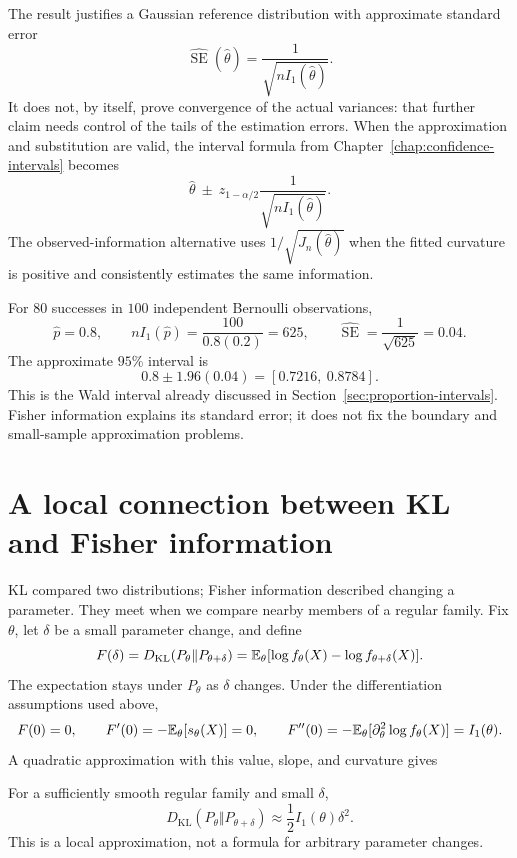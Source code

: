 The result justifies a Gaussian reference distribution with approximate
standard error
\[
  \widehat{\operatorname{SE}}(\widehat\theta)
  =\frac1{\sqrt{nI_1(\widehat\theta)}}.
\]
It does not, by itself, prove convergence of the actual variances:
that further claim needs control of the tails of the estimation errors.
When the approximation and substitution are valid, the interval formula
from Chapter~\ref{chap:confidence-intervals} becomes
\begin{equation}
  \widehat\theta\ \pm\
  z_{1-\alpha/2}\frac1{\sqrt{nI_1(\widehat\theta)}}.
  \label{eq:fisher-interval}
\end{equation}
The observed-information alternative uses
\(1/\sqrt{J_n(\widehat\theta)}\) when the fitted curvature is positive
and consistently estimates the same information.

For \(80\) successes in \(100\) independent Bernoulli observations,
\[
  \widehat p=0.8,\qquad
  nI_1(\widehat p)=\frac{100}{0.8(0.2)}=625,\qquad
  \widehat{\operatorname{SE}}=\frac1{\sqrt{625}}=0.04.
\]
The approximate \(95\%\) interval is
\[
  0.8\pm1.96(0.04)=[0.7216,\ 0.8784].
\]
This is the Wald interval already discussed in
Section~\ref{sec:proportion-intervals}. Fisher information explains its
standard error; it does not fix the boundary and small-sample
approximation problems.

\section{A local connection between KL and Fisher information}
\label{sec:local-kl-information}

KL compared two distributions; Fisher information described changing a
parameter. They meet when we compare nearby members of a regular family.
Fix \(\theta\), let \(\delta\) be a small parameter change, and define
\[
  F(\delta)=D_{\mathrm{KL}}(P_\theta\Vert P_{\theta+\delta})
  =\mathbb{E}_\theta[\log f_\theta(X)-\log f_{\theta+\delta}(X)].
\]
The expectation stays under \(P_\theta\) as \(\delta\) changes.
Under the differentiation assumptions used above,
\[
  F(0)=0,\qquad
  F'(0)=-\mathbb{E}_\theta[s_\theta(X)]=0,\qquad
  F''(0)=-\mathbb{E}_\theta[\partial_\theta^2\log f_\theta(X)]
        =I_1(\theta).
\]
A quadratic approximation with this value, slope, and curvature gives
\begin{result}
For a sufficiently smooth regular family and small \(\delta\),
\begin{equation}
  D_{\mathrm{KL}}(P_\theta\Vert P_{\theta+\delta})
       \approx\frac12 I_1(\theta)\delta^2.
  \label{eq:kl-fisher-local}
\end{equation}
This is a local approximation, not a formula for arbitrary parameter
changes.
\end{result}

